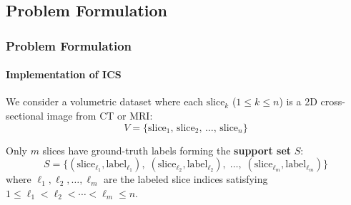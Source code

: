 \documentclass[nometaot,lecture,amberg,toc=twocolumn,indicatelastpageofframe,footlinebox]{OTHAWbeamer}
\begin{document}
\subsection{Problem Formulation}
\begin{frame}[t, label=method5]
    \frametitle{Problem Formulation}
    \framesubtitle{Implementation of ICS }
    \vspace{-0.1cm}
    We consider a volumetric dataset where each $\text{slice}_k$
    ($1 \le k \le n$) is a 2D cross-sectional image from CT or MRI:
    \[
        V = \{\text{slice}_1,\, \text{slice}_2,\, \ldots,\, \text{slice}_n\}
    \]

    Only $m$ slices have ground-truth labels forming the
    \textcolor{orange1}{\textbf{support set}} $S$:
    \vspace{-0.1cm}   
    \[
        S = \bigl\{(\text{slice}_{\ell_1}, \text{label}_{\ell_1}),\;
                   (\text{slice}_{\ell_2}, \text{label}_{\ell_2}),\;
                   \ldots,\;
                   (\text{slice}_{\ell_m}, \text{label}_{\ell_m})\bigr\}
    \]
    \vspace{-0.1cm}
    where $\ell_1, \ell_2, \ldots, \ell_m$ are the labeled slice indices satisfying
    $1 \le \ell_1 < \ell_2 < \cdots < \ell_m \le n$.

\end{frame}
\end{document}
